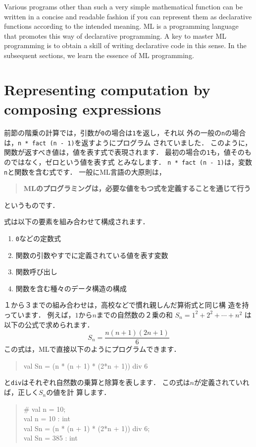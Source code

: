 \documentclass{jbook}
\newif\ifjp
\newcommand{\txt}[2]{#2}
\newenvironment{program}{\begin{quote}\begin{tt}}%
                        {\end{tt}\end{quote}}
\begin{document}
	
	Various programs other than such a very simple mathematical
function can be written in a concise and readable fashion if you
can represent them as declarative functions according to the intended
meaning.
	ML is a programming language that promotes this way of declarative
programming.
	A key to master ML programming is to obtain a skill of writing
declarative code in this sense.
	In the subsequent sections, we learn the essence of ML
programming.
\fi%

\section{
\txt{式の組み合わせによる計算の表現}
{Representing computation by composing expressions}
}
\label{sec:tutorialExpression}

\ifjp%
	前節の階乗の計算では，引数が{\tt 0}の場合は{\tt 1}を返し，それ以
外の一般の{\tt n}の場合は，{\tt n * fact (n - 1)}を返すようにプログラム
されていました．
	このように，関数が返すべき値は，値を表す式で表現されます．
	最初の場合の{\tt 1}も，値そのものではなく，ゼロという値を表す式
とみなします．
	{\tt n * fact (n - 1)}は，変数{\tt n}と関数を含む式です．
	一般にML言語の大原則は，
\begin{quote}
{\bf MLのプログラミングは，必要な値をもつ式を定義することを通じて行う}
\end{quote}
というものです．

	式は以下の要素を組み合わせて構成されます．
\begin{enumerate}
\item {\tt 0}などの定数式
\item 関数の引数やすでに定義されている値を表す変数
\item 関数呼び出し
\item 関数を含む種々のデータ構造の構成
\end{enumerate}
	１から３までの組み合わせは，高校などで慣れ親しんだ算術式と同じ構
造を持っています．
	例えば，$1$から$n$までの自然数の２乗の和
$S_n = 1^2 + 2^2 + \cdots + n^2$
は以下の公式で求められます．
\[
S_n = \frac{n (n + 1) (2n + 1)}{6}
\]
この式は，MLで直接以下のようにプログラムできます．
\begin{program}
val Sn = (n * (n + 1) * (2*n + 1)) div 6
\end{program}
	{\tt *}と{\tt div}はそれぞれ自然数の乗算と除算を表します．
	この式は$n$が定義されていれば，正しく$S_n$の値を計
算します．
\begin{program}
\# val n = 10;\\
val n = 10 : int\\
val Sn = (n * (n + 1) * (2*n + 1)) div 6;\\
val Sn = 385 : int
\end{program}
\end{document}
